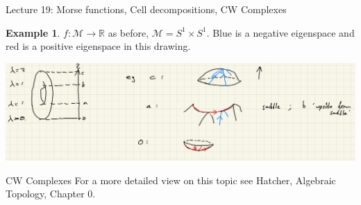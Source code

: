 \documentclass[10pt]{article}
\theoremstyle{plain}
\theoremstyle{definition}
\newtheorem{exmp}[thm]{Example} %
\newcommand{\Real}{\mathbb{R}}
\newcommand{\man}{\mathcal{M}}
\begin{document}
\begin{section}{Lecture 19: Morse functions, Cell decompositions, CW Complexes}
\begin{exmp}
    $f:\man \to \Real$ as before, $\man = S^1 \times S^1$. Blue is a negative eigenspace and red is a positive eigenspace in this drawing.
    \begin{center}
        \includegraphics[width=\textwidth]{MorseTorusEigenvalues.png}
    \end{center}
\end{exmp}

\begin{subsection}{CW Complexes}
For a more detailed view on this topic see Hatcher, Algebraic Topology, Chapter 0.


\end{subsection}
\end{section}
\end{document}

